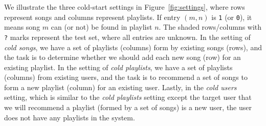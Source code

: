 We illustrate the three cold-start settings in Figure~\ref{fig:settings},
where rows represent songs and columns represent playlists.
If entry $(m, n)$ is \texttt{1} (or \texttt{0}), it means song $m$ can (or not) be found in playlist $n$.
The shaded rows/columns with \texttt{?} marks represent the test set, where all entries are unknown.
In the setting of \emph{cold songs}, we have a set of playlists (columns) form by existing songs (rows),
and the task is to determine whether we should add each new song (row) for an existing playlist.
In the setting of \emph{cold playlists}, we have a set of playlists (columns) from existing users,
and the task is to recommend a set of songs to form a new playlist (column) for an existing user.
Lastly, in the \emph{cold users} setting, which is similar to the {\it cold playlists} setting except
the target user that we will recommend a playlist (formed by a set of songs) is a new user, \ie the user
does not have any playlists in the system.

